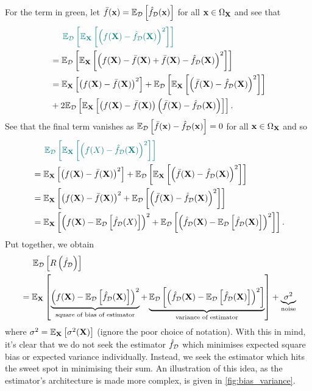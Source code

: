\documentclass[11pt]{article}
\begin{document}
For the term in green, let $\bar{f}(\mathbf{x})=\mathbb{E}_{\mathcal{D}}\left[\hat{f}_{\mathcal{D}}(\mathbf{x})\right]$ for all $\mathbf{x}\in\Omega_{\mathbf{X}}$ and see that
\begin{align*}
    &\hspace{14.52pt}
    \textcolor{myGreen}{\E_{\D}\l[\E_\X\l[\l(f(\X)-\hat{f}_{\D}(\X)\r)^2\r]\r]}\\
    &=
    \E_{\D}\l[\E_\X\l[\l(f(\X)-\bar{f}(\X)+\bar{f}(\X)-\hat{f}_{\D}(\X)\r)^2\r]\r]\\
    &=
    \E_\X\l[\l(f(\X)-\bar{f}(\X)\r)^2\r]+\E_{\D}\l[\E_\X\l[\l(\bar{f}(\X)-\hat{f}_{\D}(\X)\r)^2\r]\r]\\
    &+
    2\E_{\D}\l[\E_\X\l[\l(f(\X)-\bar{f}(\X)\r)\l(\bar{f}(\X)-\hat{f}_{\D}(\X)\r)\r]\r].
\end{align*}
See that the final term vanishes as $\mathbb{E}_{\mathcal{D}}\left[\bar{f}(\mathbf{x})-\hat{f}_{\mathcal{D}}(\mathbf{x})\right]=0$ for all $\mathbf{x}\in\Omega_{\mathbf{X}}$ and so
\begin{align*}
    &\hspace{14.52pt}
    \textcolor{myGreen}{\E_{\D}\l[\E_\X\l[\l(f(X)-\hat{f}_{\D}(\X)\r)^2\r]\r]}\\
    &=
    \E_\X\l[\l(f(\X)-\bar{f}(\X)\r)^2\r]+\E_{\D}\l[\E_\X\l[\l(\bar{f}(\X)-\hat{f}_{\D}(\X)\r)^2\r]\r]\\
    &=
    \E_\X\l[\l(f(\X)-\bar{f}(\X)\r)^2+\E_{\D}\l[\l(\bar{f}(\X)-\hat{f}_{\D}(\X)\r)^2\r]\r]\\
    &=
    \E_\X\l[\l(f(\X)-\E_{\D}\l[\hat{f}_{\D}(X)\r]\r)^2+\E_{\D}\l[\l(\hat{f}_{\D}(\X)-\E_{\D}\l[\hat{f}_{\D}(\X)\r]\r)^2\r]\r].
\end{align*}
Put together, we obtain
\begin{align*}
    &\hspace{14.52pt}
    \mathbb{E}_{\mathcal{D}}\left[R\left(\hat{f}_{\mathcal{D}}\right)\right]\\
    &=
    \mathbb{E}_{\mathbf{X}}\left[\underbrace{\left(f(\mathbf{X})-\mathbb{E}_{\mathcal{D}}\left[\hat{f}_{\mathcal{D}}(\mathbf{X})\right]\right)^2}_{\text{square of bias of estimator}}+\underbrace{\mathbb{E}_{\mathcal{D}}\left[\left(\hat{f}_{\mathcal{D}}(\mathbf{X})-\mathbb{E}_{\mathcal{D}}\left[\hat{f}_{\mathcal{D}}(\mathbf{X})\right]\right)^2\right]}_{\text{variance of estimator}}\right]+\underbrace{\sigma^2}_{\text{noise}}
\end{align*}
where $\sigma^2=\mathbb{E}_{\mathbf{X}}\left[\sigma^2(\mathbf{X})\right]$ (ignore the poor choice of notation). With this in mind, it's clear that we do not seek the estimator $\hat{f}_{\mathcal{D}}$ which minimises expected square bias or expected variance individually. Instead, we seek the estimator which hits the sweet spot in minimising their sum. An illustration of this idea, as the estimator's architecture is made more complex, is given in \autoref{fig:bias_variance}.
\end{document}
